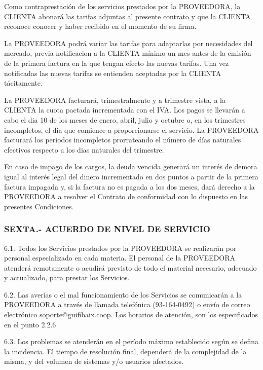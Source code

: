 \documentclass[11pt,spanish,a4paper,]{article}
\begin{document}
Como contraprestación de los servicios prestados por la PROVEEDORA, la
CLIENTA abonará las tarifas adjuntas al presente contrato y que la
CLIENTA reconoce conocer y haber recibido en el momento de su firma.

La PROVEEDORA podrá variar las tarifas para adaptarlas por necesidades
del mercado, previa notificacion a la CLIENTA mínimo un mes antes de la
emisión de la primera factura en la que tengan efecto las nuevas
tarifas. Una vez notificadas las nuevas tarifas se entienden aceptadas
por la CLIENTA tácitamente.

La PROVEEDORA facturará, trimestralmente y a trimestre vista, a la
CLIENTA la cuota pactada incrementada con el IVA. Los pagos se llevarán
a cabo el dia 10 de los meses de enero, abril, julio y octubre o, en los
trimestres incompletos, el dia que comience a proporcionarse el
servicio. La PROVEEDORA facturará los periodos incompletos prorrateando
el número de días naturales efectivos respecto a los dias naturales del
trimestre.

En caso de impago de los cargos, la deuda vencida generará un interés de
demora igual al interés legal del dinero incrementado en dos puntos a
partir de la primera factura impagada y, si la factura no es pagada a
los dos meses, dará derecho a la PROVEEDORA a resolver el Contrato de
conformidad con lo dispuesto en las presentes Condiciones.

\subsubsection{SEXTA.- ACUERDO DE NIVEL DE
SERVICIO}\label{sexta.--acuerdo-de-nivel-de-servicio}

6.1. Todos los Servicios prestados por la PROVEEDORA se realizarán por
personal especializado en cada materia. El personal de la PROVEEDORA
atenderá remotamente o acudirá previsto de todo el material necesario,
adecuado y actualizado, para prestar los Servicios.

6.2. Las averías o el mal funcionamiento de los Servicios se comunicarán
a la PROVEEDORA a través de llamada telefónica (93-164-0492) o envío de
correo electrónico soporte@guifibaix.coop. Los horarios de atención, son
los especificados en el punto 2.2.6

6.3. Los problemas se atenderán en el período máximo establecido según
se defina la incidencia. El tiempo de resolución final, dependerá de la
complejidad de la misma, y del volumen de sistemas y/o usuarios
afectados.
\end{document}
